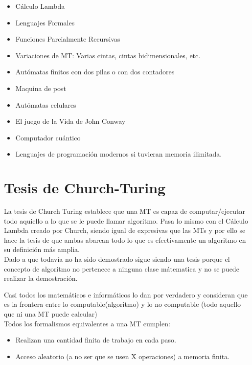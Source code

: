 \documentclass{article}
\begin{document}
\begin{itemize}
    \item Cálculo Lambda
    \item Lenguajes Formales
    \item Funciones Parcialmente Recursivas
    \item Variaciones de MT: Varias cintas, cintas bidimensionales, etc.
    \item Autómatas finitos con dos pilas o con dos contadores
    \item Maquina de post
    \item Autómatas celulares
    \item El juego de la Vida de John Conway
    \item Computador cuántico
    \item Lenguajes de programación modernos si tuvieran memoria ilimitada.
\end{itemize}

\section{Tesis de Church-Turing}

La tesis de Church Turing establece que una MT es capaz de computar/ejecutar
todo aquiello a lo que se le puede llamar algoritmo. Pasa lo mismo con el
Cálculo Lambda creado por Church, siendo igual de expresivas que las MTs y por
ello se hace la tesis de que ambas abarcan todo lo que es efectivamente un
algoritmo en su definición más amplia.\\

Dado a que todavía no ha sido demostrado sigue siendo una tesis porque el
concepto de algoritmo no pertenece a ninguna clase mátematica y no se puede
realizar la demostración.

Casi todos los matemáticos e informáticos lo dan por verdadero y consideran
que es la frontera entre lo computable(algoritmo) y lo no computable (todo
aquello que ni una MT puede calcular)\\

Todos los formalismos equivalentes a una MT cumplen:

\begin{itemize}
    \item Realizan una cantidad finita de trabajo en cada paso.
    \item Acceso aleatorio (a no ser que se usen X operaciones) a memoria
    finita.
\end{itemize}
\end{document}
